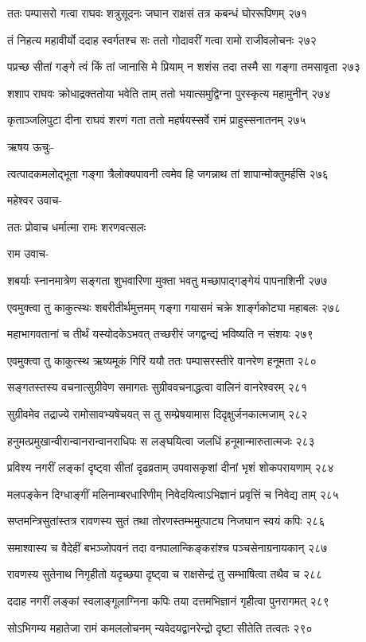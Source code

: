 ततः पम्पासरो गत्वा राघवः शत्रुसूदनः
जघान राक्षसं तत्र कबन्धं घोररूपिणम् २७१

तं निहत्य महावीर्यो ददाह स्वर्गतश्च सः
ततो गोदावरीं गत्वा रामो राजीवलोचनः २७२

पप्रच्छ सीतां गङ्गे त्वं किं तां जानासि मे प्रियाम्
न शशंस तदा तस्मै सा गङ्गा तमसावृता २७३

शशाप राघवः क्रोधाद्रक्ततोया भवेति ताम्
ततो भयात्समुद्विग्ना पुरस्कृत्य महामुनीन् २७४

कृताञ्जलिपुटा दीना राघवं शरणं गता
ततो महर्षयस्सर्वे रामं प्राहुस्सनातनम् २७५

ऋषय ऊचुः-

त्वत्पादकमलोद्भूता गङ्गा त्रैलोक्यपावनी
त्वमेव हि जगन्नाथ तां शापान्मोक्तुमर्हसि २७६

महेश्वर उवाच-

ततः प्रोवाच धर्मात्मा रामः शरणवत्सलः

राम उवाच-

शबर्याः स्नानमात्रेण सङ्गता शुभवारिणा
मुक्ता भवतु मच्छापाद्गङ्गेयं पापनाशिनी २७७

एवमुक्त्वा तु काकुत्स्थः शबरीतीर्थमुत्तमम्
गङ्गा गयासमं चक्रे शार्ङ्गकोट्या महाबलः २७८

महाभागवतानां च तीर्थं यस्योदकेऽभवत्
तच्छरीरं जगद्वन्द्यं भविष्यति न संशयः २७९

एवमुक्त्वा तु काकुत्स्थ ऋष्यमूकं गिरिं ययौ
ततः पम्पासरस्तीरे वानरेण हनूमता २८०

सङ्गतस्तस्य वचनात्सुग्रीवेण समागतः
सुग्रीववचनाद्धत्वा वालिनं वानरेश्वरम् २८१

सुग्रीवमेव तद्राज्ये रामोसावभ्यषेचयत्
स तु सम्प्रेषयामास दिदृक्षुर्जनकात्मजाम् २८२

हनुमत्प्रमुखान्वीरान्वानरान्वानराधिपः
स लङ्घयित्वा जलधिं हनूमान्मारुतात्मजः २८३

प्रविश्य नगरीं लङ्कां दृष्ट्वा सीतां दृढव्रताम्
उपवासकृशां दीनां भृशं शोकपरायणाम् २८४

मलपङ्केन दिग्धाङ्गीं मलिनाम्बरधारिणीम्
निवेदयित्वाऽभिज्ञानं प्रवृत्तिं च निवेद्य ताम् २८५

सप्तमन्त्रिसुतांस्तत्र रावणस्य सुतं तथा
तोरणस्तम्भमुत्पाट्य निजघान स्वयं कपिः २८६

समाश्वास्य च वैदेहीं बभञ्जोपवनं तदा
वनपालान्किङ्करांश्च पञ्चसेनाग्रनायकान् २८७

रावणस्य सुतेनाथ निगृहीतो यदृच्छया
दृष्ट्वा च राक्षसेन्द्रं तु सम्भाषित्वा तथैव च २८८

ददाह नगरीं लङ्कां स्वलाङ्गूलाग्निना कपिः
तया दत्तमभिज्ञानं गृहीत्वा पुनरागमत् २८९

सोऽभिगम्य महातेजा रामं कमललोचनम्
न्यवेदयद्वानरेन्द्रो दृष्टा सीतेति तत्वतः २९०


